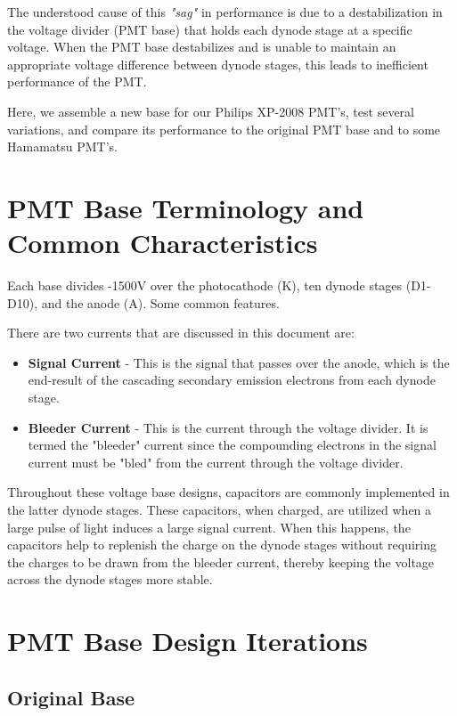 The understood cause of this \emph{"sag"} in performance is due to a destabilization in the voltage divider (PMT base) that holds each dynode stage at a specific voltage. When the PMT base destabilizes and is unable to maintain an appropriate voltage difference between dynode stages, this leads to inefficient performance of the PMT.

Here, we assemble a new base for our Philips XP-2008 PMT's, test several variations, and compare its performance to the original PMT base and to some Hamamatsu PMT's.

\section{PMT Base Terminology and Common Characteristics}

Each base divides -1500V over the photocathode (K), ten dynode stages (D1-D10), and the anode (A). Some common features.

There are two currents that are discussed in this document are:
\begin{itemize}
	\item \textbf{Signal Current} - This is the signal that passes over the anode, which is the end-result of the cascading secondary emission electrons from each dynode stage.
	\item \textbf{Bleeder Current} - This is the current through the voltage divider. It is termed the "bleeder" current since the compounding electrons in the signal current must be "bled" from the current through the voltage divider.
\end{itemize}

Throughout these voltage base designs, capacitors are commonly implemented in the latter dynode stages. These capacitors, when charged, are utilized when a large pulse of light induces a large signal current.  When this happens, the capacitors help to replenish the charge on the dynode stages without requiring the charges to be drawn from the bleeder current, thereby keeping the voltage across the dynode stages more stable.


\section{PMT Base Design Iterations}

\subsection{Original Base}

